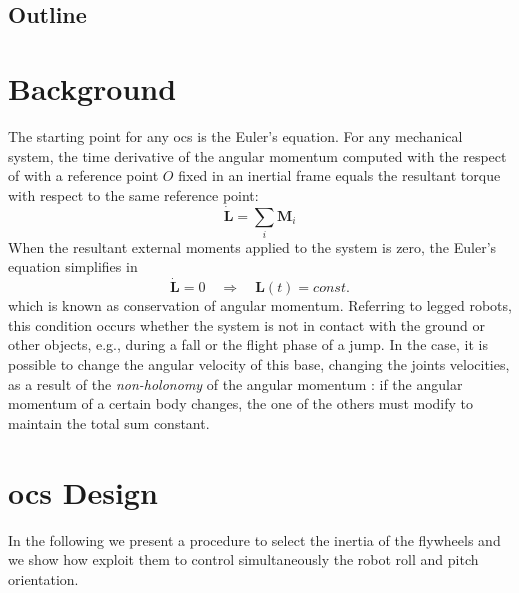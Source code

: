 \documentclass[journal,letterpaper]{IEEEtran}
\begin{document}
\subsection{Outline}
\lipsum[1]
% 

\section{Background}
The starting point for any \acrshort{ocs} is the Euler's equation. For any mechanical system, the time derivative of the angular momentum computed with the respect of with a reference point $O$ fixed in an inertial frame equals
the resultant torque with respect to the same reference point:
\begin{equation}
	\dot{\bm{L}} = \sum_i \bm{M}_i
\end{equation}
When the resultant external moments applied to the system is zero, the Euler’s equation simplifies in
\begin{equation}
\dot{\bm{L}} = 0 \quad \Rightarrow \quad \bm{L}(t) = const.
\end{equation}
which is known as conservation of angular momentum.
Referring to legged robots, this condition occurs whether the system is not in contact with the ground or other objects, e.g., during a fall or the flight phase of a jump.
In the case, it is possible to change the angular velocity of this base, changing the joints velocities, as a result of the \textit{non-holonomy} of the angular momentum \cite{Wieber16}: if the angular momentum of a certain body changes, the one of the others must modify to maintain the total sum constant.

\section{\acrlong{ocs} Design}
In the following we present  a procedure to select the inertia of the flywheels and we show how exploit them to control simultaneously the robot roll and pitch orientation.
\end{document}
